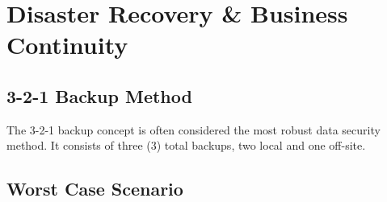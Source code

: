 \chapter{Disaster Recovery \& Business Continuity}\label{chap:backup}
\section{3-2-1 Backup Method}
The 3-2-1 backup concept is often considered the most robust data security method. It consists of three (3) total backups, two local and one off-site.
\section{Worst Case Scenario}